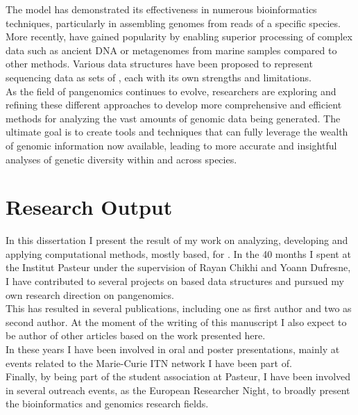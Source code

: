 The \kmer model has demonstrated its effectiveness in numerous bioinformatics techniques, particularly in assembling genomes from reads of a specific species. More recently, \kmers have gained popularity by enabling superior processing of complex data such as ancient DNA or metagenomes from marine samples compared to other methods. Various data structures have been proposed to represent sequencing data as sets of \kmers, each with its own strengths and limitations.\\
As the field of pangenomics continues to evolve, researchers are exploring and refining these different approaches to develop more comprehensive and efficient methods for analyzing the vast amounts of genomic data being generated. The ultimate goal is to create tools and techniques that can fully leverage the wealth of genomic information now available, leading to more accurate and insightful analyses of genetic diversity within and across species.\\
\section{Research Output}
In this dissertation I present the result of my work on analyzing, developing and applying computational methods, mostly \kmer based, for \pangenomics. In the 40 months I spent at the Institut Pasteur under the supervision of Rayan Chikhi and Yoann Dufresne, I have contributed to several projects on \kmer based data structures and pursued my own research direction on pangenomics.\\
This has resulted in several publications, including one as first author and two as second author. At the moment of the writing of this manuscript I also expect to be author of other articles based on the work presented here.\\
In these years I have been involved in oral and poster presentations, mainly at events related to the Marie-Curie ITN network I have been part of.\\
Finally, by being part of the student association at Pasteur, I have been involved in several outreach events, as the European Researcher Night, to broadly present the bioinformatics and genomics research fields.
